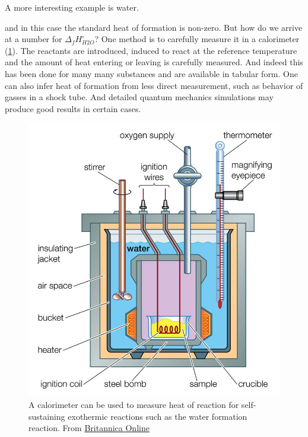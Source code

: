 \documentclass[twocolumn]{memoir} %
\makeatletter
\newcommand\reaction@[1]{\begin{equation}\ce{#1}\end{equation}}
\newcommand\reaction@nonumber[1]%
        {\begin{equation*}\ce{#1}\end{equation*}}
\newcommand\reaction{\@ifstar{\reaction@nonumber}{\reaction@}}
\makeatother
\begin{document}
A more interesting example is water.

\reaction{H2 (g) + 1/2O2 (g) -> H2O (g) + $\Delta_f H_{H2O}^\circ$}
%
and in this case the standard heat of formation is non-zero.  But how do we arrive at a number for 
$\Delta_f H_{H2O}^\circ$?  One method is to carefully measure it in a calorimeter (\cref{fig:calorimeter}).  
The reactants are introduced, induced to react at the reference temperature and the amount of
heat entering or leaving is carefully measured.  And indeed this has been done for many many substances
and are available in tabular form.  One can also infer heat of formation from less direct measurement, 
such as behavior of gasses in a shock tube.  And detailed quantum mechanics simulations may produce
good results in certain cases.

\begin{figure}[H]
    \includegraphics[width=\columnwidth]{calorimeter}
    \caption{A calorimeter can be used to measure heat of reaction for self-sustaining exothermic
    reactions such as the water formation reaction.  From \href{https://www.britannica.com/technology/calorimeter}
    {Britannica Online}}
    \label{fig:calorimeter}
\end{figure}
\end{document}
